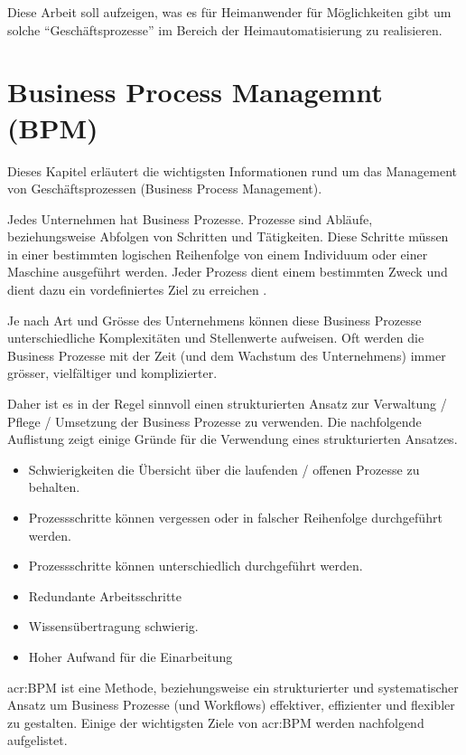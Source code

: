 Diese Arbeit soll aufzeigen, was es für Heimanwender für Möglichkeiten gibt um solche "`Geschäftsprozesse"' im Bereich der Heimautomatisierung zu realisieren.







\section{Business Process Managemnt (BPM)} \label{sec:Ausg:BPM}
Dieses Kapitel erläutert die wichtigsten Informationen rund um das Management von Geschäftsprozessen (Business Process Management).

Jedes Unternehmen hat Business Prozesse. Prozesse sind Abläufe, beziehungsweise Abfolgen von Schritten und Tätigkeiten. Diese Schritte müssen in einer bestimmten logischen Reihenfolge von einem Individuum oder einer Maschine ausgeführt werden. Jeder Prozess dient einem bestimmten Zweck und dient dazu ein vordefiniertes Ziel zu erreichen \cite{E:SearchCIO:Def:BPM}.

Je nach Art und Grösse des Unternehmens können diese Business Prozesse unterschiedliche Komplexitäten und Stellenwerte aufweisen. Oft werden die Business Prozesse mit der Zeit (und dem Wachstum des Unternehmens) immer grösser, vielfältiger und komplizierter.

Daher ist es in der Regel sinnvoll einen strukturierten Ansatz zur Verwaltung / Pflege / Umsetzung der Business Prozesse zu verwenden. Die nachfolgende Auflistung zeigt einige Gründe für die Verwendung eines strukturierten Ansatzes.

\begin{itemize}
\item Schwierigkeiten die Übersicht über die laufenden / offenen Prozesse zu behalten.
\item Prozessschritte können vergessen oder in falscher Reihenfolge durchgeführt werden.
\item Prozessschritte können unterschiedlich durchgeführt werden.
\item Redundante Arbeitsschritte
\item Wissensübertragung schwierig.
\item Hoher Aufwand für die Einarbeitung
\end{itemize}

\newpage
\gls{acr:BPM} ist eine Methode, beziehungsweise ein strukturierter und systematischer Ansatz um Business Prozesse (und Workflows) effektiver, effizienter und flexibler zu gestalten.
Einige der wichtigsten Ziele von \gls{acr:BPM} werden nachfolgend aufgelistet.

